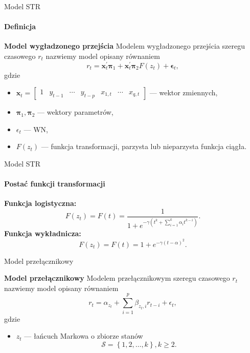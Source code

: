 \documentclass[a4paper, 11pt]{beamer}
\begin{document}
	\begin{frame}{Model STR}
		\framesubtitle{Definicja}
		\begin{block}{\textbf{Model wygładzonego przejścia}}
			Modelem wygładzonego przejścia szeregu czasowego $r_t$ nazwiemy model opisany równaniem \[
				r_t = 
					\boldsymbol{x}_{t}^{\prime} \boldsymbol{\pi}_{1} + 
					\boldsymbol{x}_{t}^{\prime} \boldsymbol{\pi}_{2} F\left(z_t\right) + 
					\boldsymbol{\epsilon}_{t},
			\] gdzie
			\begin{itemize}
				\item $\boldsymbol{x}_{t} = \left[\begin{matrix}
						1 & y_{t-1} & \cdots & y_{t-p} & x_{1,t} & \cdots & x_{q,t}
					\end{matrix}\right]$ --- wektor zmiennych,
				\item $\boldsymbol{\pi}_{1}, \boldsymbol{\pi}_{2}$ --- wektory parametrów,
				\item $\epsilon_t$ --- WN,
				\item $F\left(z_t\right)$ --- funkcja transformacji, parzysta lub nieparzysta funkcja ciągła.
			\end{itemize}
		\end{block}
	\end{frame}
	
	\begin{frame}{Model STR}
		\framesubtitle{Postać funkcji transformacji}
		\textbf{Funkcja logistyczna:} \[
			F\left(z_t\right) = F\left(t\right) = \frac{1}{
				1 + e^{-\gamma\left(t^k + \sum_{i=1}^{k} \alpha_i t^{k-i}\right)}
			}.
		\]
		\textbf{Funkcja wykładnicza:} \[
			F\left(z_t\right) = F\left(t\right) = 
				1 + e^{-\gamma\left(t - \alpha\right)^2}.
		\]
	\end{frame}
	
	\begin{frame}{Model przełącznikowy}
		\begin{block}{\textbf{Model przełącznikowy}}
			Modelem przełącznikowym szeregu czasowego $r_t$ nazwiemy model opisany równaniem \[
				r_t = \alpha_{z_t} + \sum_{i=1}^{p} \beta_{z_t,i} r_{t-i} + \epsilon_t,
			\] gdzie
			\begin{itemize}
				\item $z_{t}$ --- łańcuch Markowa o zbiorze stanów \[\mathcal{S} = \left\{1, 2, \ldots, k\right\}, k \geq 2.\]
			\end{itemize}
		\end{block}
	\end{frame}
	
\end{document}
